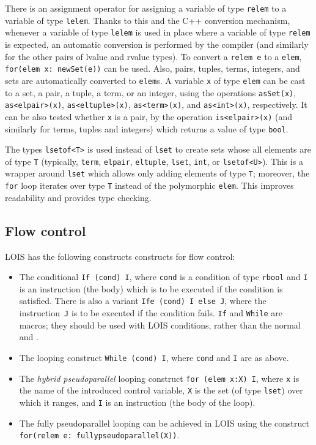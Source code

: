 There is an assignment operator for assigning a variable of type {\tt relem} to a 
variable of type {\tt lelem}. Thanks to this and the C++ conversion mechanism, whenever
a variable of type {\tt lelem} is used in place where a variable of type {\tt relem} is
expected, an automatic conversion is performed by the compiler (and similarly for the
other pairs of lvalue and rvalue types).
To convert a {\tt relem e} to a {\tt elem}, \verb-for(elem x: newSet(e))- can be used.
Also, pairs, tuples, terms, integers, and sets are automatically converted to {\tt elem}s.
A variable {\tt x} of type {\tt elem} can be cast to a set, a pair, a tuple, a term, or an integer, using the operations {\tt asSet(x)}, {\tt as<elpair>(x)}, {\tt as<eltuple>(x)}, {\tt as<term>(x)}, and {\tt as<int>(x)}, respectively. It can be also tested whether {\tt x} is a pair, by the operation {\tt is<elpair>(x)} (and similarly for terms, tuples and integers) which returns a value of type {\tt bool}. 

The types \verb-lsetof<T>- is used instead of \verb-lset- 
to create sets whose all elements are of type \verb-T- (typically, 
\verb-term-, \verb-elpair-, \verb-eltuple-, \verb-lset-, \verb-int-, or \verb-lsetof<U>-). 
This is a wrapper around \verb-lset- which allows only adding elements
of type \verb-T-; moreover, the \verb-for- loop iterates over type \verb-T- instead
of the polymorphic \verb-elem-. 
This improves readability and provides type checking.



\subsection{Flow control}
LOIS has the following constructs constructs for flow control:
\begin{itemize}
\item The conditional {\tt If (cond) I}, where {\tt cond} is a condition of type {\tt rbool} and {\tt I} is an instruction (the body) which is to be executed if the condition is satisfied. There is also a variant 
{\tt Ife (cond) I else J}, where the instruction~{\tt J} is to be executed if the condition fails. {\tt If} and {\tt While} are macros; they should be used with LOIS conditions, rather than the normal {\pcif} and {\while}.
\item The looping construct {\tt While (cond) I}, where {\tt cond} and {\tt I} are as above.
\item The \emph{hybrid pseudoparallel} looping construct {\tt for (elem x:X) I},
where {\tt x} is the name of the introduced {control variable}, {\tt X} is the set (of type {\tt lset}) over which it ranges, and {\tt I} is an instruction (the body of the loop).
\item The fully pseudoparallel looping can be achieved in LOIS using the construct
{\tt for(relem e: fullypseudoparallel(X))}.
\end{itemize}


